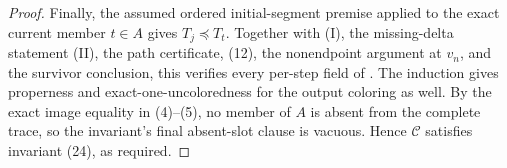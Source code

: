\begin{proof}
Finally, the assumed ordered initial-segment premise applied to the exact
current member \(t\in A\) gives \(T_j\preccurlyeq T_t\).  Together with
(I), the missing-delta statement (II), the path certificate, (12), the
nonendpoint argument at \(v_n\), and the survivor conclusion, this
verifies every per-step field of
.  The induction gives
properness and exact-one-uncoloredness for the output coloring as well.
By the exact image equality in (4)--(5), no member of \(A\) is absent
from the complete trace, so the invariant's final absent-slot clause is
vacuous.  Hence \(\mathcal C\) satisfies invariant (24), as required.
\end{proof}

